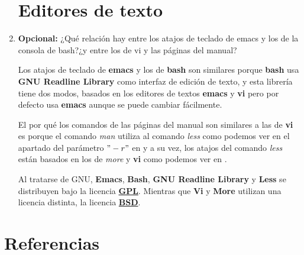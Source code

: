 \documentclass[paper=a4, fontsize=11pt]{scrartcl} %
\numberwithin{equation}{section} %
\numberwithin{figure}{section} %
\numberwithin{table}{section} %
\begin{document}
\begin{enumerate}
	\section{Editores de texto}
		\item \textbf{Opcional:} ¿Qué relación hay entre los atajos de teclado de emacs y los de
		la consola de bash?¿y entre los de vi y las páginas del manual?
		
		Los atajos de teclado de \textbf{emacs} y los de \textbf{bash} son similares porque \textbf{bash}
		\cite{man_bash} usa \textbf{GNU Readline Library}\cite{GNURL} como interfaz de edición de texto,
		y esta librería tiene dos modos, basados en los editores de textos \textbf{emacs} y \textbf{vi}
		pero por defecto usa \textbf{emacs} aunque se puede cambiar fácilmente.
		
		El por qué los comandos de las páginas del manual son similares a las de \textbf{vi} es porque
		el comando \textit{man} utiliza al comando \textit{less} como podemos ver en el apartado del
		parámetro $"-r"$ en \cite{man_man} y a su vez, los atajos del comando \textit{less} están
		basados en los de \textit{more} y \textbf{vi} como podemos ver en \cite{man_less}.
		
		Al tratarse de GNU, \textbf{Emacs}, \textbf{Bash}, \textbf{GNU Readline Library} y \textbf{Less}
		se distribuyen bajo la licencia \href{https://www.gnu.org/licenses/gpl.html}{\textbf{GPL}}.
		Mientras que \textbf{Vi} y \textbf{More} utilizan una licencia distinta, la licencia
		\href{http://www.freebsd.org/copyright/license.html}{\textbf{BSD}}.
		
		
\end{enumerate}

\newpage
\section{Referencias}

\end{document}
